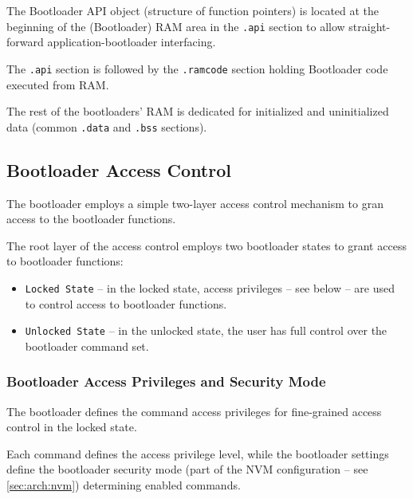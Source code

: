 The Bootloader API object (structure of function pointers) is located at the beginning of the (Bootloader) RAM area in the \texttt{.api} section to allow straight-forward application-bootloader interfacing. 

The \texttt{.api} section is followed by the \texttt{.ramcode} section holding Bootloader code executed from RAM. 

The rest of the bootloaders' RAM is dedicated for initialized and uninitialized data (common \texttt{.data} and \texttt{.bss} sections).




\clearpage
\subsection{Bootloader Access Control} \label{sec:arch:access}

The bootloader employs a simple two-layer access control mechanism to gran access to the bootloader functions.

The root layer of the access control employs two bootloader states to grant access to bootloader functions:

\begin{itemize}
  \item \texttt{Locked State} -- in the locked state, access privileges -- see  below -- are used to control access to bootloader functions.
  \item \texttt{Unlocked State} -- in the unlocked state, the user has full control over the bootloader command set.
\end{itemize}

\subsubsection*{Bootloader Access Privileges and Security Mode} \label{sec:arch:secModes}

The bootloader defines the command access privileges for fine-grained access control in the locked state. 

Each command defines the access privilege level, while the bootloader settings define the bootloader security mode
(part of the NVM configuration -- see \ref{sec:arch:nvm}) determining enabled commands. 

